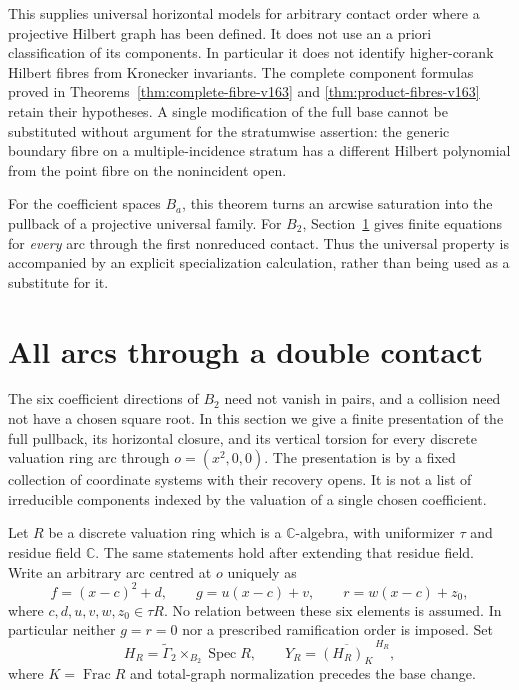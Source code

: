 \documentclass[11pt,reqno]{amsart}
\numberwithin{equation}{section}
\theoremstyle{definition}\newtheorem{definition}[theorem]{Definition}
\theoremstyle{remark}\newtheorem{remark}[theorem]{Remark}
\newcommand{\C}{\mathbb C}\newcommand{\Q}{\mathbb Q}
\begin{document}
This supplies universal horizontal models for arbitrary contact order
where a projective Hilbert graph has been defined. It does not use
an a priori classification of its components. In particular it does
not identify higher-corank Hilbert fibres from Kronecker invariants.
The complete component formulas proved in
Theorems~\ref{thm:complete-fibre-v163} and
\ref{thm:product-fibres-v163} retain their hypotheses. A single
modification of the full base cannot be substituted without argument
for the stratumwise assertion: the generic boundary fibre on a
multiple-incidence stratum has a different Hilbert polynomial from
the point fibre on the nonincident open.

For the coefficient spaces $B_a$, this theorem turns an arcwise
saturation into the pullback of a projective universal family. For
$B_2$, Section~\ref{sec:all-arcs-v166} gives finite equations for \emph{every} arc
through the first nonreduced contact. Thus the universal property is
accompanied by an explicit specialization calculation, rather than
being used as a substitute for it.

\section{All arcs through a double contact}
\label{sec:all-arcs-v166}
The six coefficient directions of $B_2$ need not vanish in pairs,
and a collision need not have a chosen square root. In this section
we give a finite presentation of the full pullback, its horizontal
closure, and its vertical torsion for every discrete valuation ring
arc through $o=(x^2,0,0)$. The presentation is by a fixed collection
of coordinate systems with their recovery opens. It is not a list
of irreducible components indexed by the valuation of a single
chosen coefficient.

Let $R$ be a discrete valuation ring which is a $\C$-algebra, with
uniformizer $\tau$ and residue field $\C$. The same statements hold
after extending that residue field. Write an arbitrary arc centred
at $o$ uniquely as
\begin{equation}\label{eq:all-arc-coefficients-v166}
 f=(x-c)^2+d,\qquad g=u(x-c)+v,\qquad
 r=w(x-c)+z_0,
\end{equation}
where $c,d,u,v,w,z_0\in\tau R$. No relation between these six
elements is assumed. In particular neither $g=r=0$ nor a prescribed
ramification order is imposed. Set
\[
 H_R=\widetilde\Gamma_2\times_{B_2}\operatorname{Spec}R,
 \qquad Y_R=\overline{(H_R)_K}^{\,H_R},
\]
where $K=\operatorname{Frac}R$ and total-graph normalization precedes
the base change.
\end{document}
